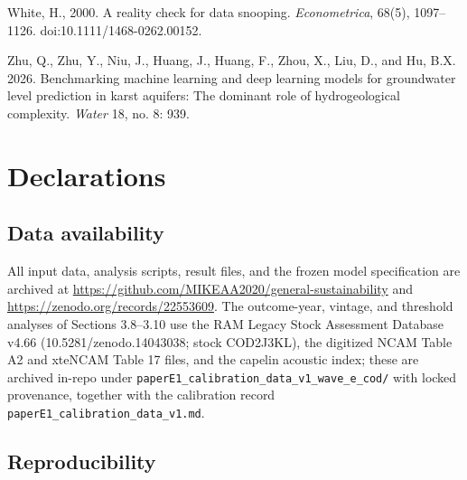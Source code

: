 \documentclass[11pt]{article}
\begin{document}
White, H., 2000. A reality check for data snooping. \emph{Econometrica}, 68(5),
1097--1126. doi:10.1111/1468-0262.00152.

Zhu, Q., Zhu, Y., Niu, J., Huang, J., Huang, F., Zhou, X., Liu, D., and
Hu, B.X. 2026. Benchmarking machine learning and deep learning models
for groundwater level prediction in karst aquifers: The dominant role of
hydrogeological complexity. \emph{Water} 18, no. 8: 939.

\section*{Declarations}

\subsection*{Data availability}

All input data, analysis scripts, result files, and the frozen model
specification are archived at
\url{https://github.com/MIKEAA2020/general-sustainability} and
\url{https://zenodo.org/records/22553609}. The outcome-year, vintage,
and threshold analyses of Sections 3.8--3.10 use the RAM Legacy Stock
Assessment Database v4.66 (10.5281/zenodo.14043038; stock COD2J3KL), the
digitized NCAM Table A2 and xteNCAM Table 17 files, and the capelin
acoustic index; these are archived in-repo under
\texttt{paperE1\_calibration\_data\_v1\_wave\_e\_cod/} with locked
provenance, together with the calibration record
\texttt{paperE1\_calibration\_data\_v1.md}.

\subsection*{Reproducibility}
\end{document}
